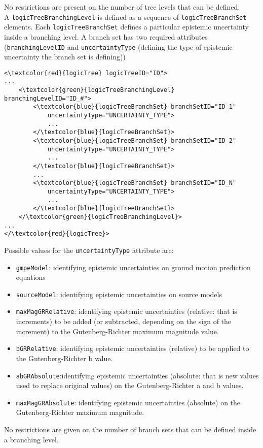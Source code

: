 No restrictions are present on the number of tree levels that can be defined.\\
A \Verb+logicTreeBranchingLevel+ is defined as a sequence of \Verb+logicTreeBranchSet+ elements. Each \Verb+logicTreeBranchSet+ defines a particular epistemic uncertainty inside a branching level. A branch set has two required attributes (\Verb+branchingLevelID+ and \Verb+uncertaintyType+ (defining the type of epistemic uncertainty the branch set is defining))
\begin{Verbatim}[frame=single, commandchars=\\\{\}]
<\textcolor{red}{logicTree} logicTreeID="ID">
...
	<\textcolor{green}{logicTreeBranchingLevel} branchingLevelID="ID_#">
		<\textcolor{blue}{logicTreeBranchSet} branchSetID="ID_1"
			uncertaintyType="UNCERTAINTY_TYPE">
			...
		</\textcolor{blue}{logicTreeBranchSet}>
		<\textcolor{blue}{logicTreeBranchSet} branchSetID="ID_2"
			uncertaintyType="UNCERTAINTY_TYPE">
			...
		</\textcolor{blue}{logicTreeBranchSet}>
		...
		<\textcolor{blue}{logicTreeBranchSet} branchSetID="ID_N"
			uncertaintyType="UNCERTAINTY_TYPE">
			...
		</\textcolor{blue}{logicTreeBranchSet}>
	</\textcolor{green}{logicTreeBranchingLevel}>
...
</\textcolor{red}{logicTree}>
\end{Verbatim}
Possible values for the \Verb+uncertaintyType+ attribute are:
\begin{itemize}
\item \Verb+gmpeModel+: identifying epistemic uncertainties on ground motion prediction equations
\item \Verb+sourceModel+: identifying epistemic uncertainties on source models
\item \Verb+maxMagGRRelative+: identifying epistemic uncertainties (relative: that is increments) to be added (or subtracted, depending on the sign of the increment) to the Gutenberg-Richter maximum magnitude value.
\item \Verb+bGRRelative+: identifying epistemic uncertainties (relative) to be applied to the Gutenberg-Richter b value.
\item \Verb+abGRAbsolute+:identifying epistemic uncertainties (absolute: that is new values used to replace original values) on the Gutenberg-Richter a and b values.
\item \Verb+maxMagGRAbsolute+: identifying epistemic uncertainties (absolute) on the Gutenberg-Richter maximum magnitude.
\end{itemize}
No restrictions are given on the number of branch sets that can be defined inside a branching level.\\
